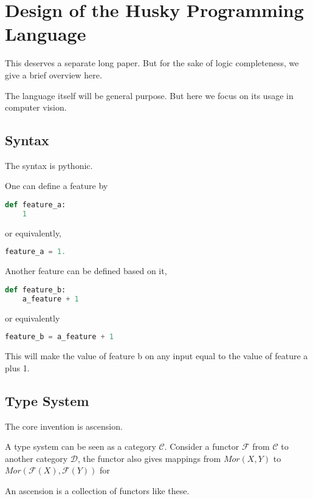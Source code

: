 \documentclass[11pt]{article} 	%
\theoremstyle{definition}
\begin{document}
\section{Design of the Husky Programming Language}

This deserves a separate long paper. But for the sake of logic completeness, we give a brief overview here.

The language itself will be general purpose. But here we focus on its usage in computer vision.

\subsection{Syntax}

The syntax is pythonic.

One can define a feature by
\begin{lstlisting}[language=Python]
def feature_a:
    1
\end{lstlisting}

or equivalently,

\begin{lstlisting}[language=Python]
feature_a = 1.
\end{lstlisting}

Another feature can be defined based on it,

\begin{lstlisting}[language=Python]
def feature_b:
    a_feature + 1
\end{lstlisting}

or equivalently

\begin{lstlisting}[language=Python]
feature_b = a_feature + 1
\end{lstlisting}

This will make the value of feature b on any input equal to the value of feature a plus 1.

\subsection{Type System}

The core invention is ascension.

A type system can be seen as a category $\mathcal{C}$. Consider a functor $\mathcal{F}$ from $\mathcal{C}$ to another category $\mathcal{D}$,
the functor also gives mappings from $Mor(X,Y)$ to $Mor(\mathcal{F}(X), \mathcal{F}(Y))$ for 

An ascension is a collection of functors like these.
\end{document}
